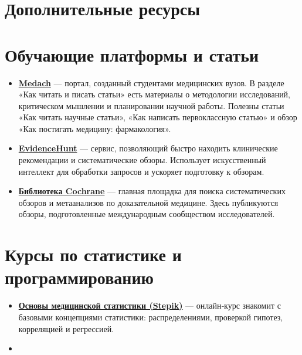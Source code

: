 \documentclass[
  russian,
  12pt,
  a4paper,
]{article}
\providecommand{\tightlist}{%
  \setlength{\itemsep}{0pt}\setlength{\parskip}{0pt}}
\begin{document}
\chapter{Дополнительные
ресурсы}\label{ux434ux43eux43fux43eux43bux43dux438ux442ux435ux43bux44cux43dux44bux435-ux440ux435ux441ux443ux440ux441ux44b}

\chapter{Обучающие платформы и статьи}\label{sec-resources}

\begin{itemize}
\item
  \href{https://medach.pro}{\textbf{Medach}} --- портал, созданный
  студентами медицинских вузов. В разделе «Как читать и писать статьи»
  есть материалы о методологии исследований, критическом мышлении и
  планировании научной работы. Полезны статьи «Как читать научные
  статьи», «Как написать первоклассную статью» и обзор «Как постигать
  медицину: фармакология».
\item
  \href{https://evidencehunt.com}{\textbf{EvidenceHunt}} --- сервис,
  позволяющий быстро находить клинические рекомендации и систематические
  обзоры. Использует искусственный интеллект для обработки запросов и
  ускоряет подготовку к обзорам.
\item
  \href{https://www.cochranelibrary.com}{\textbf{Библиотека Cochrane}}
  --- главная площадка для поиска систематических обзоров и метаанализов
  по доказательной медицине. Здесь публикуются обзоры, подготовленные
  международным сообществом исследователей.
\end{itemize}

\chapter{Курсы по статистике и
программированию}\label{ux43aux443ux440ux441ux44b-ux43fux43e-ux441ux442ux430ux442ux438ux441ux442ux438ux43aux435-ux438-ux43fux440ux43eux433ux440ux430ux43cux43cux438ux440ux43eux432ux430ux43dux438ux44e}

\begin{itemize}
\tightlist
\item
  \href{https://stepik.org/course/Основы-медицинской-статистики-1253}{\textbf{Основы
  медицинской статистики (Stepik)}} --- онлайн‑курс знакомит с базовыми
  концепциями статистики: распределениями, проверкой гипотез,
  корреляцией и регрессией.
\item
\end{itemize}
\end{document}
